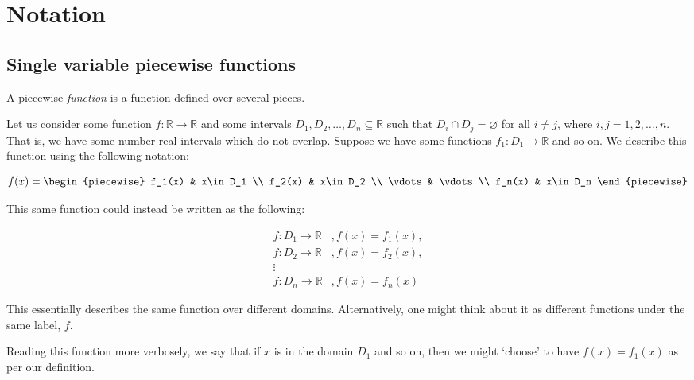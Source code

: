 \label{section:notation}
\chapter{Notation}
\section{Single variable piecewise functions}
A piecewise \textit{function} is a function defined over several pieces.

Let us consider some function $f:\mathbb{R}\to\mathbb{R}$ and some intervals ${D_1,D_2,\dots,D_n\subseteq\mathbb{R}}$ such that $D_i\cap D_j=\varnothing$ for all $i\neq j$, where $i,j=1,2,\dots,n$. That is, we have some number real intervals which do not overlap. Suppose we have some functions $f_1: D_1\to\mathbb{R}$ and so on. We describe this function using the following notation:

$$
    f(x) = \begin{piecewise}
                f_1(x) & x\in D_1 \\
                f_2(x) & x\in D_2 \\
                \vdots & \vdots \\
                f_n(x) & x\in D_n
            \end{piecewise}
$$

This same function could instead be written as the following:

\begin{align*}
    f:D_1\to\mathbb{R}&, f(x)=f_1(x), \\
    f:D_2\to\mathbb{R}&, f(x)=f_2(x), \\
    \vdots \\
    f:D_n\to\mathbb{R}&, f(x)=f_n(x)
\end{align*}

This essentially describes the same function over different domains. Alternatively, one might think about it as different functions under the same label, $f$.

Reading this function more verbosely, we say that if $x$ is in the domain $D_1$ and so on, then we might `choose' to have $f(x)=f_1(x)$ as per our definition.

